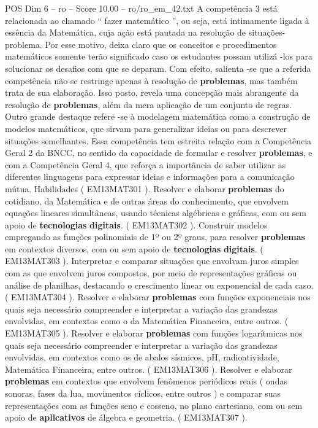 \begin{textsample}{POS Dim 6 – ro – Score 10.00 – ro/ro\_em\_42.txt}
A competência 3 está relacionada ao chamado “ fazer matemático ”, ou seja, está intimamente ligada à essência da Matemática, cuja ação está pautada na resolução de situações-problema.
Por esse motivo, deixa claro que os conceitos e procedimentos matemáticos somente terão significado caso os estudantes possam utilizá -los para solucionar os desafios com que se deparam.
Com efeito, salienta -se que a referida competência não se restringe apenas à resolução de \textbf{problemas}, mas também trata de sua elaboração.
Isso posto, revela uma concepção mais abrangente da resolução de \textbf{problemas}, além da mera aplicação de um conjunto de regras.
Outro grande destaque refere -se à modelagem matemática como a construção de modelos matemáticos, que sirvam para generalizar ideias ou para descrever situações semelhantes.
Essa competência tem estreita relação com a Competência Geral 2 da BNCC, no sentido da capacidade de formular e resolver \textbf{problemas}, e com a Competência Geral 4, que reforça a importância de saber utilizar as diferentes linguagens para expressar ideias e informações para a comunicação mútua.
Habilidades ( EM13MAT301 ).
Resolver e elaborar \textbf{problemas} do cotidiano, da Matemática e de outras áreas do conhecimento, que envolvem equações lineares simultâneas, usando técnicas algébricas e gráficas, com ou sem apoio de \textbf{tecnologias} \textbf{digitais}. ( EM13MAT302 ).
Construir modelos empregando as funções polinomiais de 1º ou 2º graus, para resolver \textbf{problemas} em contextos diversos, com ou sem apoio de \textbf{tecnologias} \textbf{digitais}. ( EM13MAT303 ).
Interpretar e comparar situações que envolvam juros simples com as que envolvem juros compostos, por meio de representações gráficas ou análise de planilhas, destacando o crescimento linear ou exponencial de cada caso. ( EM13MAT304 ).
Resolver e elaborar \textbf{problemas} com funções exponenciais nos quais seja necessário compreender e interpretar a variação das grandezas envolvidas, em contextos como o da Matemática Financeira, entre outros. ( EM13MAT305 ).
Resolver e elaborar \textbf{problemas} com funções logarítmicas nos quais seja necessário compreender e interpretar a variação das grandezas envolvidas, em contextos como os de abalos sísmicos, pH, radioatividade, Matemática Financeira, entre outros. ( EM13MAT306 ).
Resolver e elaborar \textbf{problemas} em contextos que envolvem fenômenos periódicos reais ( ondas sonoras, fases da lua, movimentos cíclicos, entre outros ) e comparar suas representações com as funções seno e cosseno, no plano cartesiano, com ou sem apoio de \textbf{aplicativos} de álgebra e geometria. ( EM13MAT307 ).

\end{textsample}
